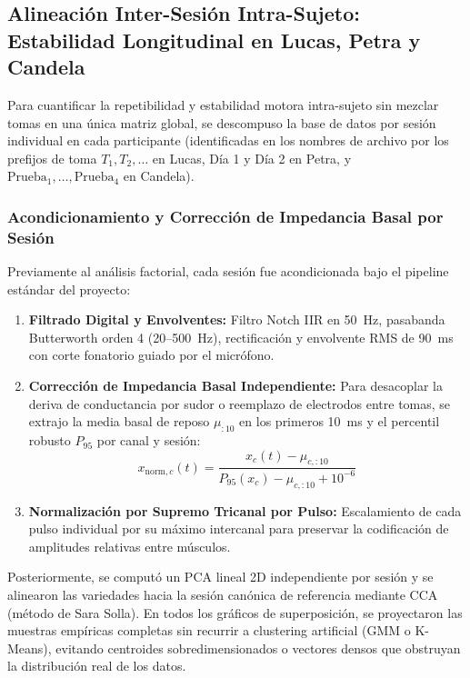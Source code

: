 \documentclass[11pt,a4paper,openany]{book}
\theoremstyle{definition}
\begin{document}
\subsection{Alineación Inter-Sesión Intra-Sujeto: Estabilidad Longitudinal en Lucas, Petra y Candela}
\label{subsec:pca_inter_sesion_intra_sujeto}

Para cuantificar la repetibilidad y estabilidad motora intra-sujeto sin mezclar tomas en una única matriz global, se descompuso la base de datos por sesión individual en cada participante (identificadas en los nombres de archivo por los prefijos de toma $T_1, T_2, \dots$ en Lucas, Día 1 y Día 2 en Petra, y $\text{Prueba}_1, \dots, \text{Prueba}_4$ en Candela). 

\subsubsection{Acondicionamiento y Corrección de Impedancia Basal por Sesión}
Previamente al análisis factorial, cada sesión fue acondicionada bajo el pipeline estándar del proyecto:
\begin{enumerate}
    \item \textbf{Filtrado Digital y Envolventes:} Filtro Notch IIR en 50~Hz, pasabanda Butterworth orden 4 (20--500~Hz), rectificación y envolvente RMS de 90~ms con corte fonatorio guiado por el micrófono.
    \item \textbf{Corrección de Impedancia Basal Independiente:} Para desacoplar la deriva de conductancia por sudor o reemplazo de electrodos entre tomas, se extrajo la media basal de reposo $\mu_{:10}$ en los primeros 10~ms y el percentil robusto $P_{95}$ por canal y sesión:
    \begin{equation}
        x_{\text{norm}, c}(t) = \frac{x_c(t) - \mu_{c,:10}}{P_{95}(x_c) - \mu_{c,:10} + 10^{-6}}
    \end{equation}
    \item \textbf{Normalización por Supremo Tricanal por Pulso:} Escalamiento de cada pulso individual por su máximo intercanal para preservar la codificación de amplitudes relativas entre músculos.
\end{enumerate}

Posteriormente, se computó un PCA lineal 2D independiente por sesión y se alinearon las variedades hacia la sesión canónica de referencia mediante CCA (método de Sara Solla). En todos los gráficos de superposición, se proyectaron las muestras empíricas completas sin recurrir a clustering artificial (GMM o K-Means), evitando centroides sobredimensionados o vectores densos que obstruyan la distribución real de los datos.
\end{document}
